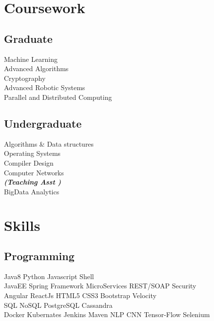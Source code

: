 \documentclass[]{kk-resume-openfont}
\begin{document}
\begin{minipage}[t]{0.33\textwidth}

\section{Coursework}
\subsection{Graduate}
Machine Learning \\
Advanced Algorithms \\
Cryptography \\
Advanced Robotic Systems \\
Parallel and Distributed Computing \\
\sectionsep

\subsection{Undergraduate}
Algorithms \& Data structures \\
Operating Systems \\
Compiler Design \\
Computer Networks \\
{\footnotesize \textit{\textbf{(Teaching Asst ) }}} \\
BigData Analytics \\


\section{Skills}
\subsection{Programming}
Java8 \textbullet{}  Python \textbullet{} Javascript \textbullet{}  Shell\\
JavaEE \textbullet{} Spring Framework        
\textbullet{} MicroServices \textbullet{} REST/SOAP \textbullet{} Security\\ 
Angular \textbullet{} ReactJs \textbullet{} HTML5 \textbullet{} CSS3 \textbullet{} Bootstrap \textbullet{} Velocity\\
SQL \textbullet{} NoSQL \textbullet{} PostgreSQL\textbullet{} Cassandra\\
 Docker \textbullet{} Kubernates \textbullet{} Jenkins \textbullet{} Maven
 NLP\textbullet{} CNN \textbullet{} Tensor-Flow \textbullet{}  Selenium
\sectionsep

%
%

\end{minipage} 
\end{document}
